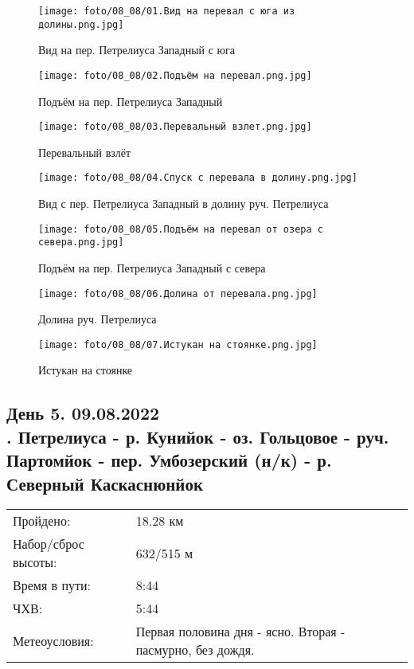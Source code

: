 \begin{figure}
    \centering
    \texttt{[image: foto/08\_08/01.Вид на перевал с юга из долины.png.jpg]}
    \caption{Вид на пер. Петрелиуса Западный с юга}
\end{figure}

\begin{figure}
    \centering
    \texttt{[image: foto/08\_08/02.Подъём на перевал.png.jpg]}
    \caption{Подъём на пер. Петрелиуса Западный}
\end{figure}

\begin{figure}
    \centering
    \texttt{[image: foto/08\_08/03.Перевальный взлет.png.jpg]}
    \caption{Перевальный взлёт}
\end{figure}

\begin{figure}
    \centering
    \texttt{[image: foto/08\_08/04.Спуск с перевала в долину.png.jpg]}
    \caption{Вид с пер. Петрелиуса Западный в долину руч. Петрелиуса}
\end{figure}

\begin{figure}
    \centering
    \texttt{[image: foto/08\_08/05.Подъём на перевал от озера с севера.png.jpg]}
    \caption{Подъём на пер. Петрелиуса Западный с севера}
\end{figure}

\begin{figure}
    \centering
    \texttt{[image: foto/08\_08/06.Долина от перевала.png.jpg]}
    \caption{Долина руч. Петрелиуса}
\end{figure}

\begin{figure}[H]
    \centering
    \texttt{[image: foto/08\_08/07.Истукан на стоянке.png.jpg]}
    \caption{Истукан на стоянке}
\end{figure}

\subsection{День 5. 09.08.2022\\
. Петрелиуса - р. Кунийок - оз. Гольцовое  - руч. Партомйок - пер. Умбозерский (н/к) - р. Северный Каскаснюнйок}
\begin{tabular}{l p{12cm}}
\hline
Пройдено: & 18.28 км\\
Набор/сброс высоты: & 632/515 м\\
Время в пути: & 8:44\\
ЧХВ: & 5:44\\
Метеоусловия: & Первая половина дня - ясно. Вторая - пасмурно, без дождя.\\
\hline
\end{tabular}

